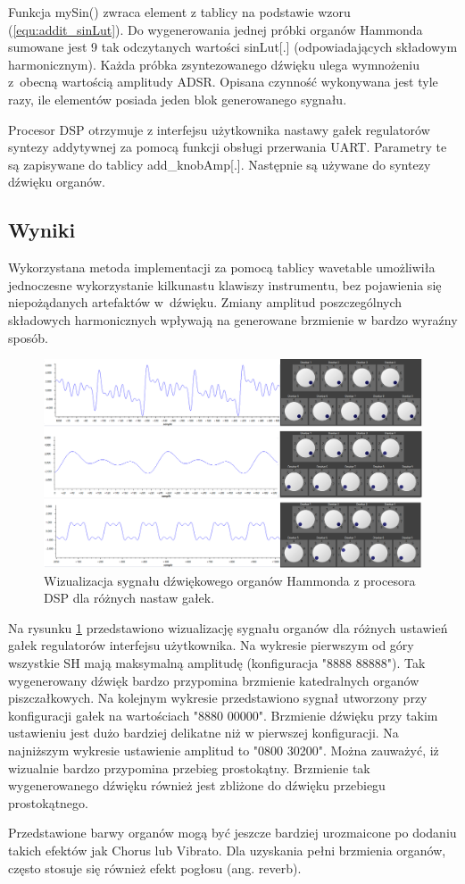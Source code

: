 Funkcja mySin() zwraca element z tablicy na podstawie wzoru (\ref{equ:addit_sinLut}). Do wygenerowania jednej próbki organów Hammonda sumowane jest 9 tak odczytanych wartości sinLut[.] (odpowiadających składowym harmonicznym). Każda próbka zsyntezowanego dźwięku ulega wymnożeniu z~obecną wartością amplitudy ADSR. Opisana czynność wykonywana jest tyle razy, ile elementów posiada jeden blok generowanego sygnału.

Procesor DSP otrzymuje z interfejsu użytkownika nastawy gałek regulatorów syntezy addytywnej za pomocą funkcji obsługi przerwania UART. Parametry te są zapisywane do tablicy add\_knobAmp[.]. Następnie są używane do syntezy dźwięku organów.

\subsection{Wyniki}
Wykorzystana metoda implementacji za pomocą tablicy wavetable umożliwiła jednoczesne wykorzystanie kilkunastu klawiszy instrumentu, bez pojawienia się niepożądanych artefaktów w~dźwięku. Zmiany amplitud poszczególnych składowych harmonicznych wpływają na generowane brzmienie w bardzo wyraźny sposób.

\begin{figure}[H]
	\centering
	\includegraphics[width=15cm]{grafiki/add_hammond_dsp}
	\captionsetup{justification=centering}
	\caption{Wizualizacja sygnału dźwiękowego organów Hammonda z procesora DSP dla różnych nastaw gałek.}
	\label{rys:add_hammond_dsp}
\end{figure}

Na rysunku \ref{rys:add_hammond_dsp} przedstawiono wizualizację sygnału organów dla różnych ustawień gałek regulatorów interfejsu użytkownika. Na wykresie pierwszym od góry wszystkie SH mają maksymalną amplitudę (konfiguracja "8888 88888"). Tak wygenerowany dźwięk bardzo przypomina brzmienie katedralnych organów piszczałkowych. Na kolejnym wykresie przedstawiono sygnał utworzony przy konfiguracji gałek na wartościach "8880 00000". Brzmienie dźwięku przy takim ustawieniu jest dużo bardziej delikatne niż w pierwszej konfiguracji. Na najniższym wykresie ustawienie amplitud to "0800 30200". Można zauważyć, iż wizualnie bardzo przypomina przebieg prostokątny. Brzmienie tak wygenerowanego dźwięku również jest zbliżone do dźwięku przebiegu prostokątnego.

Przedstawione barwy organów mogą być jeszcze bardziej urozmaicone po dodaniu takich efektów jak Chorus lub Vibrato. Dla uzyskania pełni brzmienia organów, często stosuje się również efekt pogłosu (ang. reverb).